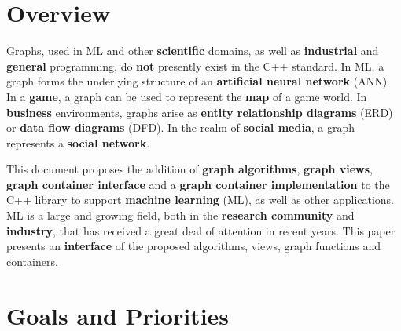 
\section{Overview}

Graphs, used in ML and other \textbf{scientific} domains, as well as \textbf{industrial} and \textbf{general} programming, 
do \textbf{not} presently exist in the C++ standard. In ML, a graph forms the underlying structure of an \textbf{artificial neural network} (ANN). 
In a \textbf{game}, a graph can be used to represent the \textbf{map} of a game world. In \textbf{business} environments, graphs arise as 
\textbf{entity relationship diagrams} (ERD) or \textbf{data flow diagrams} (DFD). In the realm of \textbf{social media}, a graph represents a 
\textbf{social network}.

This document proposes the addition of \textbf{graph algorithms}, \textbf{graph views}, \textbf{graph container interface} and a 
\textbf{graph container implementation} to the C++ library to support \textbf{machine learning} (ML), as well as other applications. 
ML is a large and growing field, both in the \textbf{research community} and \textbf{industry}, that has received a great deal of 
attention in recent years. This paper presents an \textbf{interface} of the proposed algorithms, views, graph functions and containers.

\section{Goals and Priorities}


